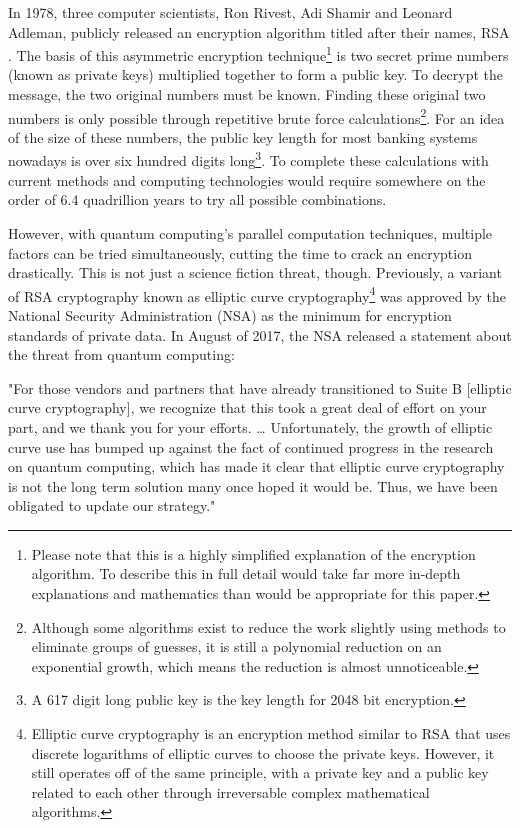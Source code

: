 \documentclass[10pt,journal,compsoc]{IEEEtran}
\begin{document}
In 1978, three computer scientists, Ron Rivest, Adi Shamir and Leonard Adleman, publicly released an encryption algorithm titled after their names, RSA \cite{RSA}. The basis of this asymmetric encryption technique\footnote{Please note that this is a highly simplified explanation of the encryption algorithm. To describe this in full detail would take far more in-depth explanations and mathematics than would be appropriate for this paper.} is two secret prime numbers (known as private keys) multiplied together to form a public key. To decrypt the message, the two original numbers must be known. Finding these original two numbers is only possible through repetitive brute force calculations\footnote{Although  some algorithms exist to reduce the work slightly using methods to eliminate groups of guesses, it is still a polynomial reduction on an exponential growth, which means the reduction is almost unnoticeable.}. For an idea of the size of these numbers, the public key length for most banking systems nowadays is over six hundred digits long\footnote{A 617 digit long public key is the key length for 2048 bit encryption.}\cite{Numberphile}. To complete these calculations with current  methods and computing technologies  would require somewhere on the order of 6.4 quadrillion years to try all possible combinations. 

However, with quantum computing's parallel computation techniques, multiple factors can be tried simultaneously, cutting the time to crack an encryption drastically. This is not just a science fiction threat, though. Previously, a variant of RSA cryptography known as elliptic curve cryptography\footnote{Elliptic curve cryptography is an encryption method similar to RSA that uses discrete logarithms of elliptic curves to choose the private keys. However, it still operates off of the same principle, with a private key and a public key related to each other through irreversable complex mathematical algorithms.} was approved by the National Security Administration (NSA) as the minimum for encryption standards of private data. In August of 2017, the NSA released a statement about the threat from quantum computing:

"For those vendors and partners that have already transitioned to Suite B [elliptic curve cryptography], we recognize that this took a great deal of effort on your part, and we thank you for your efforts. … Unfortunately, the growth of elliptic curve use has bumped up against the fact of continued progress in the research on quantum computing, which has made it clear that elliptic curve cryptography is not the long term solution many once hoped it would be. Thus, we have been obligated to update our strategy."\cite{Information}
\end{document}
